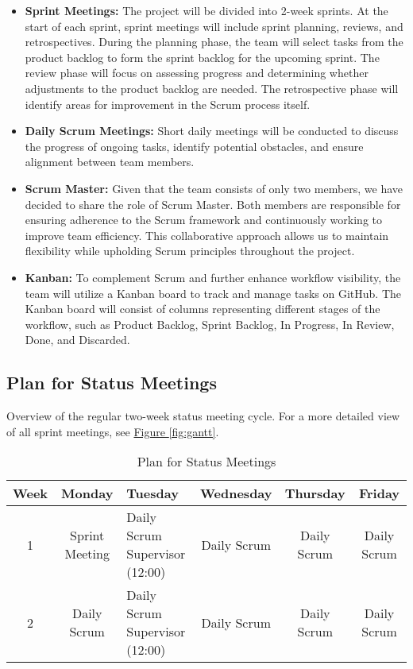 \begin{itemize}
    \item \textbf{Sprint Meetings:} The project will be divided into 2-week sprints. At the start of each sprint, sprint meetings will include sprint planning, reviews, and retrospectives. During the planning phase, the team will select tasks from the product backlog to form the sprint backlog for the upcoming sprint. The review phase will focus on assessing progress and determining whether adjustments to the product backlog are needed. The retrospective phase will identify areas for improvement in the Scrum process itself.
    \item \textbf{Daily Scrum Meetings:} Short daily meetings will be conducted to discuss the progress of ongoing tasks, identify potential obstacles, and ensure alignment between team members.
    \item \textbf{Scrum Master:} Given that the team consists of only two members, we have decided to share the role of Scrum Master. Both members are responsible for ensuring adherence to the Scrum framework and continuously working to improve team efficiency. This collaborative approach allows us to maintain flexibility while upholding Scrum principles throughout the project.
    \item \textbf{Kanban:} To complement Scrum and further enhance workflow visibility, the team will utilize a Kanban board to track and manage tasks on GitHub. The Kanban board will consist of columns representing different stages of the workflow, such as Product Backlog, Sprint Backlog, In Progress, In Review, Done, and Discarded.
\end{itemize}

\subsection{Plan for Status Meetings}

Overview of the regular two-week status meeting cycle. For a more detailed view of all sprint meetings, see \hyperref[fig:gantt]{Figure \ref*{fig:gantt}}.

\begin{table}[H]
    \centering
    \begin{tabularx}{\textwidth}{|c|c|>{\centering\arraybackslash}X|c|c|c|}
    \hline
    \textbf{Week} & \textbf{Monday} & \textbf{Tuesday} & \textbf{Wednesday} & \textbf{Thursday} & \textbf{Friday} \\
    \hline
    1 & Sprint Meeting & \makecell{Daily Scrum \\ Supervisor (12:00)} & Daily Scrum & Daily 
    Scrum & Daily Scrum \\
    \hline
    2 & Daily Scrum & \makecell{Daily Scrum \\ Supervisor (12:00)} & Daily Scrum & Daily 
    Scrum & Daily Scrum \\
    \hline
    \end{tabularx}
    \caption{Plan for Status Meetings}
    \label{tab:meeting_plan}
\end{table}

\newpage
